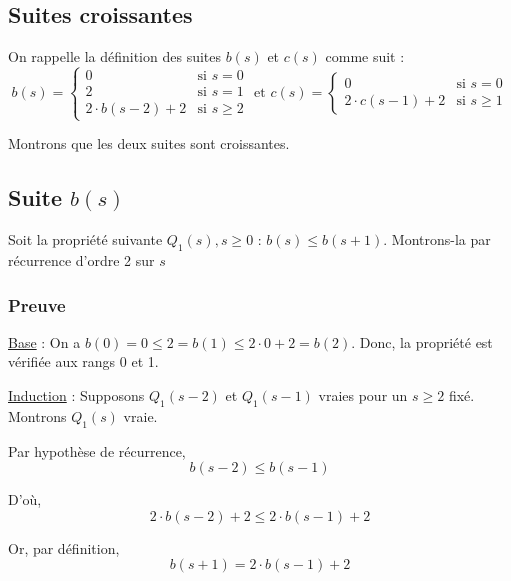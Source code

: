 \documentclass[12pt,a4paper]{article}
\begin{document}
\newpage
\begin{appendices}
 \section{Suites croissantes}
 \label{appendix:suites}
 On rappelle la d\'efinition des suites $b(s)$ et $c(s)$ comme suit :
\begin{equation*}
\left .b(s) = \begin{cases} 
      0 & \text{si } s = 0 \\
      2 & \text{si } s = 1 \\
      2\cdot b(s-2) + 2 & \text{si } s\geq 2 
   \end{cases} \right.
   \text{ et }
\left .c(s) = \begin{cases} 
      0 & \text{si } s = 0 \\
      2\cdot c(s-1) + 2 & \text{si } s\geq 1 
   \end{cases} \right.
\end{equation*}

Montrons que les deux suites sont croissantes.

\subsection*{Suite $b(s)$}
Soit la propri\'et\'e suivante $Q_{1}(s), s \geq 0$ : $b(s) \leq b(s+1)$.
Montrons-la par r\'ecurrence d'ordre 2 sur $s$

\subsubsection*{Preuve}
\underline{Base} : On a $b(0) = 0 \leq 2 = b(1) \leq 2\cdot 0 + 2 = b(2)$. 
Donc, la propri\'et\'e est v\'erifi\'ee aux rangs 0 et 1.

\medskip
\underline{Induction} : Supposons $Q_{1}(s-2)$ et $Q_{1}(s-1)$ vraies pour un $s \geq 2$ fix\'e. 
Montrons $Q_{1}(s)$ vraie.

\smallskip
Par hypoth\`ese de r\'ecurrence,
\begin{equation*}
   b(s-2) \leq b(s-1)
\end{equation*}

D'o\`u, 
\begin{equation}
   2\cdot b(s-2)+2 \leq 2\cdot b(s-1)+2 \label{eq:ineg_a1}
\end{equation}

Or, par d\'efinition, 
\begin{equation}
   b(s+1) = 2\cdot b(s-1) + 2 \label{eq:def_a1}
\end{equation}


\end{appendices}
\end{document}
